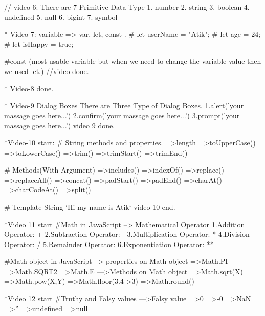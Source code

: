 // video-6: There are 7 Primitive Data Type
1. number
2. string
3. boolean
4. undefined
5. null
6. bigint
7. symbol

* Video-7: 
variable => var, let, const .
# let userName = "Atik";
# let age = 24;
# let isHappy = true;

#const (most usable variable but  when we need to change the variable value then we used let.)
//video done.

* Video-8 done.

* Video-9 
Dialog Boxes
There are Three Type of Dialog Boxes.
1.alert('your massage goes here...')
2.confirm('your massage goes here...')
3.prompt('your massage goes here...')
video 9 done.

*Video-10 start: 
# String methods and properties.
=>length
=>toUpperCase()
=>toLowerCase()
=>trim()
=>trimStart()
=>trimEnd()

# Methods(With Argument)
=>includes()
=>indexOf()
=>replace()
=>replaceAll()
=>concat()
=>padStart()
=>padEnd()
=>charAt()
=>charCodeAt()
=>split()

# Template String 
`Hi my name is Atik`
video 10 end.

*Video 11 start
#Math in JavaScript
--> Mathematical Operator
1.Addition Operator: +
2.Subtraction Operator: -
3.Multiplication Operator: *
4.Division Operator: /
5.Remainder Operator: %
6.Exponentiation Operator: **

#Math object in JavaScript
--> properties on Math object
=>Math.PI 
=>Math.SQRT2
=>Math.E
--->Methods on Math object
=>Math.sqrt(X)
=>Math.pow(X,Y)
=>Math.floor(3.4->3)
=>Math.round()

*Video 12 start
#Truthy and Falsy values
--->Falsy value
=>0
=>-0
=>NaN
=>''
=>undefined
=>null